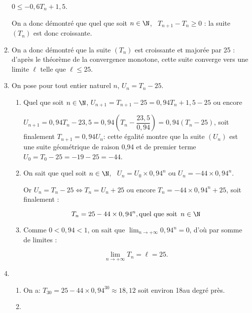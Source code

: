 \begin{enumerate}
$0 \leqslant - 0,6T_n + 1,5$.

On a donc démontré que quel que soit $n \in \N$, \, $T_{n+1}-T_n  \geqslant 0$ : la suite $\left(T_n\right)$ est donc croissante.
\item %
On a donc démontré que la suite $\left(T_n\right)$ est croissante et majorée par 25 : d'après le théorème de la convergence monotone, cette suite converge vers une limite $\ell$ telle que $\ell \leqslant 25$.
\item On pose pour tout entier naturel $n$, $U_n = T_n - 25$.
\begin{enumerate}
\item %
Quel que soit $n \in \N$, $U_{n+1} = T_{n+1} - 25 = 0,94T_n + 1,5 - 25$ ou encore 

$U_{n+1} = 0,94T_n - 23,5 = 0,94\left(T_n - \dfrac{23,5}{0,94} \right) = 0,94\left(T_n - 25 \right)$, soit finalement $T_{n+1} = 0,94U_n$: cette égalité montre que la suite $\left(U_n\right)$ est une suite géométrique de raison 0,94 et de premier terme $U_0 = T_0 - 25 = - 19 - 25 = - 44$.
\item %
On sait que quel soit $n \in \N$, \, $U_n = U_0 \times 0,94^n$ ou 
$U_n = - 44 \times 0,94^n$.

Or $U_n = T_n - 25 \iff T_n = U_n + 25$ ou encore $T_n = - 44 \times 0,94^n + 25$, soit finalement :

\[T_n = 25 - 44 \times 0,94^n, \text{quel que soit }\, n \in \N\]

\item %
Comme $0 < 0,94 < 1$, on sait que $\displaystyle\lim_{n \to + \infty} 0,94^n = 0$, d'où par somme de limites :

\[\displaystyle\lim_{n \to + \infty} T_n = \ell = 25.\]

\end{enumerate}
\item 
	\begin{enumerate}
		\item %
		 
On a: $T_{30} = 25 - 44 \times 0,94^{30} \approx 18,12$ soit environ 18\textcelsius au degré près.
		\item %
		

\end{enumerate}
\end{enumerate}
